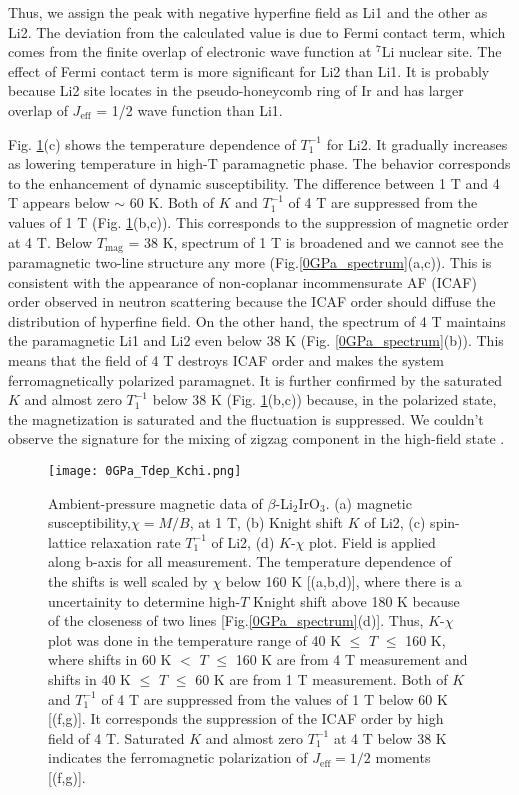 Thus, we assign the peak with negative hyperfine field as Li1 and the other as Li2.
The deviation from the calculated value is due to Fermi contact term, which comes from the finite overlap of electronic wave function at ${}^7$Li nuclear site.
The effect of Fermi contact term is more significant for Li2 than Li1.
It is probably because Li2 site locates in the pseudo-honeycomb ring of Ir and has larger overlap of $J_\mathrm{eff}$ = 1/2 wave function than Li1.

Fig. \ref{0GPa_Tdep_Kchi}(c) shows the temperature dependence of $T^{-1}_1$ for Li2.
It gradually increases as lowering temperature in high-T paramagnetic phase.
The behavior corresponds to the enhancement of dynamic susceptibility.
The difference between 1 T and 4 T appears below $\sim$ 60 K.
Both of $K$ and $T^{-1}_1$ of 4 T are suppressed from the values of 1 T (Fig. \ref{0GPa_Tdep_Kchi}(b,c)).
This corresponds to the suppression of magnetic order at 4 T.
Below $T_{\mathrm{mag}}$ = 38 K, spectrum of 1 T is broadened and we cannot see the paramagnetic two-line structure any more (Fig.\ref{0GPa_spectrum}(a,c)).
This is consistent with the appearance of non-coplanar incommensurate AF (ICAF) order observed in neutron scattering
because the ICAF order should diffuse the distribution of hyperfine field.
On the other hand, the spectrum of 4 T maintains the paramagnetic Li1 and Li2 even below 38 K (Fig. \ref{0GPa_spectrum}(b)).
This means that the field of 4 T destroys ICAF order and makes the system ferromagnetically polarized paramagnet.
It is further confirmed by the saturated $K$ and almost zero $T^{-1}_1$ below 38 K (Fig. \ref{0GPa_Tdep_Kchi}(b,c))
because, in the polarized state, the magnetization is saturated and the fluctuation is suppressed.
We couldn't observe the signature for the mixing of zigzag component in the high-field state \cite{ruiz2017correlated}.

\begin{figure}
  \centering
  \texttt{[image: 0GPa\_Tdep\_Kchi.png]}
  \caption{Ambient-pressure magnetic data of $\beta$-Li$_2$IrO$_3$.
  (a) magnetic susceptibility,$\chi = M/B$, at 1 T, (b) Knight shift $K$ of Li2, (c) spin-lattice relaxation rate $T^{-1}_1$ of Li2, (d) $K$-$\chi$ plot.
  Field is applied along b-axis for all measurement.
  The temperature dependence of the shifts is well scaled by $\chi$ below 160 K [(a,b,d)],
  where there is a uncertainity to determine high-$T$ Knight shift above 180 K because of the closeness of two lines [Fig.\ref{0GPa_spectrum}(d)].
  Thus, $K$-$\chi$ plot was done in the temperature range of 40 K $\leq$ $T$ $\leq$ 160 K, where shifts in 60 K $<$ $T$ $\leq$ 160 K are from 4 T measurement and
  shifts in 40 K $\leq$ $T$ $\leq$ 60 K are from 1 T measurement.
  Both of $K$ and $T^{-1}_1$ of 4 T are suppressed from the values of 1 T below 60 K [(f,g)].
  It corresponds the suppression of the ICAF order by high field of 4 T.
  Saturated $K$ and almost zero $T^{-1}_1$ at 4 T below 38 K indicates the ferromagnetic polarization of $J_{\mathrm{eff}} = 1/2$ moments [(f,g)].}
  \label{0GPa_Tdep_Kchi}
\end{figure}

